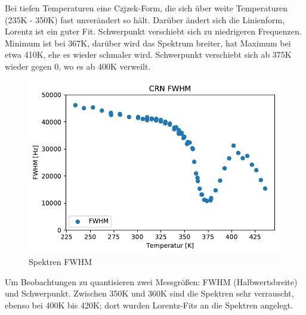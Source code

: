 Bei tiefen Temperaturen eine Czjzek-Form, die sich über weite Temperaturen (235K - 350K) fast unverändert so hält. Darüber ändert sich die Linienform, Lorentz ist ein guter Fit. Schwerpunkt verschiebt sich zu niedrigeren Frequenzen. Minimum ist bei 367K, darüber wird das Spektrum breiter, hat Maximum bei etwa 410K, ehe es wieder schmaler wird. Schwerpunkt verschiebt sich ab 375K wieder gegen 0, wo es ab 400K verweilt.


\begin{figure}
	\begin{center}
		\includegraphics[width=\textwidth]{graphics/plots/SPEK/spek_fwhm.pdf}
	\end{center}
	\caption{Spektren FWHM} \label{fig:res:spek_fwhm}
\end{figure}
Um Beobachtungen zu quantisieren zwei Messgrößen: FWHM (Halbwertsbreite) und Schwerpunkt. Zwischen 350K und 360K sind die Spektren sehr verrauscht, ebenso bei 400K bis 420K; dort wurden Lorentz-Fits an die Spektren angelegt.


